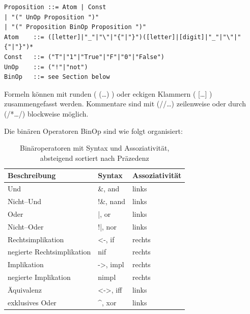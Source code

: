 \documentclass[ngerman,a4paper,abstracton,open=right,twoside=false,toc=listofnumbered,bibtotocnumbered]{scrreprt}
\begin{document}
\begin{verbatim}	
Proposition	::=	Atom | Const
| "(" UnOp Proposition ")"
| "(" Proposition BinOp Proposition ")"
Atom	::=	([letter]|"_"|"\"|"{"|"}")([letter]|[digit]|"_"|"\"|"{"|"}")*
Const	::=	("T"|"1"|"True"|"F"|"0"|"False")
UnOp	::=	("!"|"not")
BinOp	::=	see Section below
\end{verbatim}

Formeln können mit runden ( (\dots) ) oder eckigen Klammern ( [\dots] ) zusammengefasst werden. Kommentare sind mit (//\dots) zeilenweise oder durch (/*\dots */) blockweise möglich.

Die binären Operatoren \glqq{}BinOp\grqq{} sind wie folgt organisiert:

\begin{table}[h]
	\begin{tabular}{|l|l|l|}
		\hline
		\textbf{Beschreibung} & \textbf{Syntax} & \textbf{Assoziativität} \\
		\hline
		Und & \&, and & links \\ \hline
		Nicht--Und & !\&, nand & links \\ \hline
		Oder & |, or & links \\ \hline
		Nicht--Oder & !|, nor & links \\ \hline
		Rechtsimplikation & <-, if & rechts \\ \hline
		negierte Rechtsimplikation & nif & rechts \\ \hline
		Implikation & ->, impl & rechts \\ \hline
		negierte Implikation & nimpl & rechts \\ \hline
		Äquivalenz & <->, iff & links \\ \hline
		exklusives Oder & \textasciicircum, xor & links \\ \hline
	\end{tabular}
	\caption{Binäroperatoren mit Syntax und Assoziativität, absteigend sortiert nach Präzedenz}
\end{table}
\end{document}
